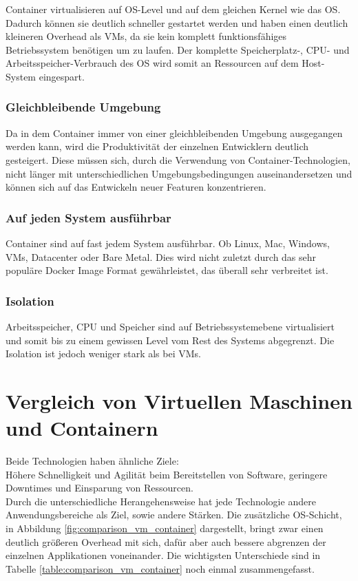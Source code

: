 Container virtualisieren auf \ac{OS}-Level und auf dem gleichen Kernel wie das \ac{OS}.
Dadurch können sie deutlich schneller gestartet werden und haben einen deutlich kleineren Overhead als \ac{VM}s, da sie kein komplett funktionsfähiges Betriebssystem benötigen um zu laufen.
Der komplette Speicherplatz-, \ac{CPU}- und Arbeitsspeicher-Verbrauch des \ac{OS} wird somit an Ressourcen auf dem Host-System eingespart.

\subsubsection{Gleichbleibende Umgebung}
Da in dem Container immer von einer gleichbleibenden Umgebung ausgegangen werden kann, wird die Produktivität der einzelnen Entwicklern deutlich gesteigert.
Diese müssen sich, durch die Verwendung von Container-Technologien, nicht länger mit unterschiedlichen Umgebungsbedingungen auseinandersetzen und können sich auf das Entwickeln neuer Featuren konzentrieren.

\subsubsection{Auf jeden System ausführbar}
Container sind auf fast jedem System ausführbar. 
Ob Linux, Mac, Windows, \ac{VM}s, Datacenter oder Bare Metal.
Dies wird nicht zuletzt durch das sehr populäre Docker Image Format gewährleistet, das überall sehr verbreitet ist. 

\subsubsection{Isolation}
Arbeitsspeicher, \ac{CPU} und Speicher sind auf Betriebssystemebene virtualisiert und somit bis zu einem gewissen Level vom Rest des Systems abgegrenzt.
Die Isolation ist jedoch weniger stark als bei \ac{VM}s.



\section{Vergleich von Virtuellen Maschinen und Containern}

Beide Technologien haben ähnliche Ziele: \\
Höhere Schnelligkeit und Agilität beim Bereitstellen von Software, geringere Downtimes und Einsparung von Ressourcen. \\
Durch die unterschiedliche Herangehensweise hat jede Technologie andere Anwendungsbereiche als Ziel, sowie andere Stärken.
Die zusätzliche \ac{OS}-Schicht, in Abbildung \ref{fig:comparison_vm_container} dargestellt, bringt zwar einen deutlich größeren Overhead mit sich, dafür aber auch bessere abgrenzen der einzelnen Applikationen voneinander.
Die wichtigsten Unterschiede sind in Tabelle \ref{table:comparison_vm_container} noch einmal zusammengefasst. 


